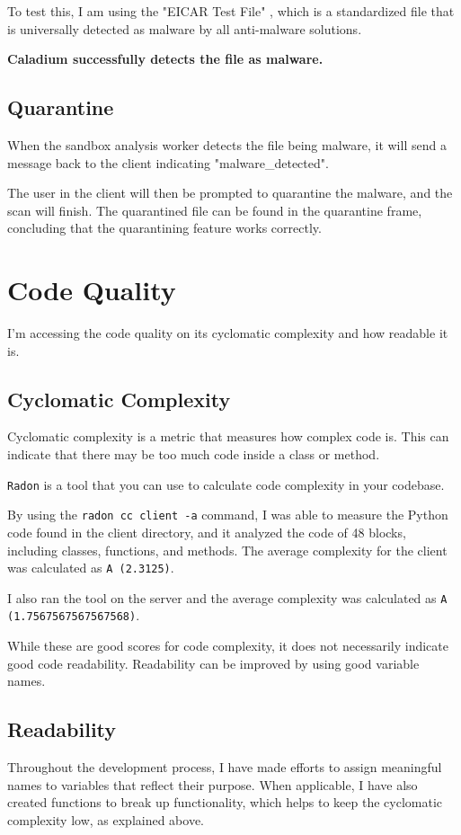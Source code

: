 To test this, I am using the "EICAR Test File" \cite{EICAR},
which is a standardized file that is universally
detected as malware by all anti-malware solutions.

\textbf{Caladium successfully detects the file as malware.}

\subsection{Quarantine}
When the sandbox analysis worker detects the file being malware,
it will send a message back to the client indicating "malware\_detected".

The user in the client will then be prompted to quarantine the malware,
and the scan will finish.
The quarantined file can be found in the quarantine frame,
concluding that the quarantining feature works correctly.

\section{Code Quality}
I'm accessing the code quality on its cyclomatic complexity and how readable it is.

\subsection{Cyclomatic Complexity}
Cyclomatic complexity is a metric that measures how complex code is.
This can indicate that there may be too much code inside a class or method.

\texttt{Radon} is a tool that you can use to
calculate code complexity in your codebase.

By using the \texttt{radon cc client -a} command,
I was able to measure the Python code found in the client directory,
and it analyzed the code of 48 blocks,
including classes, functions, and methods.
The average complexity for the client was calculated as \texttt{A (2.3125)}.

I also ran the tool on the server and the average complexity
was calculated as \texttt{A (1.7567567567567568)}.

While these are good scores for code complexity,
it does not necessarily indicate good code readability.
Readability can be improved by using good variable names.

\subsection{Readability}
Throughout the development process,
I have made efforts to assign meaningful names to variables that reflect their purpose.
When applicable, I have also created functions to break up functionality,
which helps to keep the cyclomatic complexity low, as explained above.

